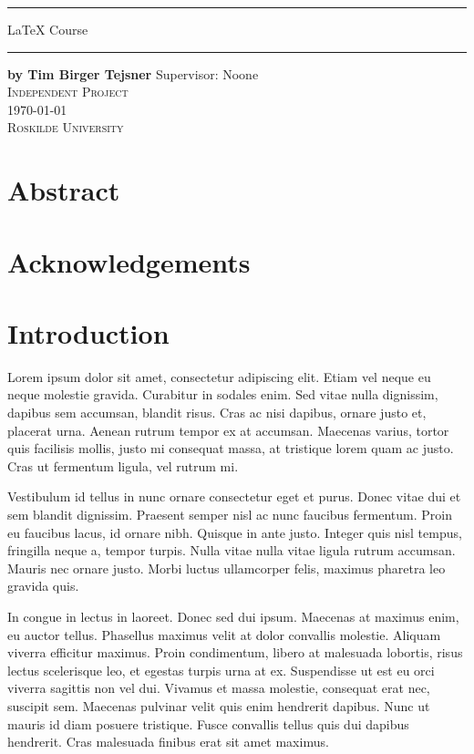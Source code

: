\documentclass[a4paper,openright,twoside]{memoir}
\begin{document}
\begin{titlingpage}
\centering
\vspace{1cm}
\hrule
\vspace{1cm}
\Huge \textsf{\LaTeX{} Course}
\vspace{8mm}
\hrule
\vspace{1cm}
\normalsize \textbf{by Tim Birger Tejsner}
\vfill
\small Supervisor: Noone \\
\vspace{1cm}
\textsc{Independent Project\\ \today} \\
\textsc{\textsc{Roskilde University}}
\end{titlingpage}


\chapter*{Abstract}

\chapter*{Acknowledgements}

\cleartorecto
\tableofcontents*
\clearpage
{}


\chapter{Introduction}
Lorem ipsum dolor sit amet, consectetur adipiscing elit. Etiam vel neque eu neque molestie gravida. Curabitur in sodales enim. Sed vitae nulla dignissim, dapibus sem accumsan, blandit risus. Cras ac nisi dapibus, ornare justo et, placerat urna. Aenean rutrum tempor ex at accumsan. Maecenas varius, tortor quis facilisis mollis, justo mi consequat massa, at tristique lorem quam ac justo. Cras ut fermentum ligula, vel rutrum mi.

Vestibulum id tellus in nunc ornare consectetur eget et purus. Donec vitae dui et sem blandit dignissim. Praesent semper nisl ac nunc faucibus fermentum. Proin eu faucibus lacus, id ornare nibh. Quisque in ante justo. Integer quis nisl tempus, fringilla neque a, tempor turpis. Nulla vitae nulla vitae ligula rutrum accumsan. Mauris nec ornare justo. Morbi luctus ullamcorper felis, maximus pharetra leo gravida quis.

In congue in lectus in laoreet. Donec sed dui ipsum. Maecenas at maximus enim, eu auctor tellus. Phasellus maximus velit at dolor convallis molestie. Aliquam viverra efficitur maximus. Proin condimentum, libero at malesuada lobortis, risus lectus scelerisque leo, et egestas turpis urna at ex. Suspendisse ut est eu orci viverra sagittis non vel dui. Vivamus et massa molestie, consequat erat nec, suscipit sem. Maecenas pulvinar velit quis enim hendrerit dapibus. Nunc ut mauris id diam posuere tristique. Fusce convallis tellus quis dui dapibus hendrerit. Cras malesuada finibus erat sit amet maximus.
\end{document}
